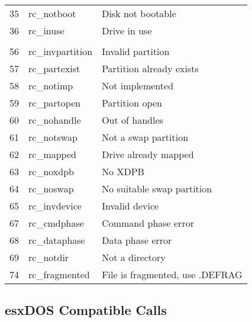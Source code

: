 \begin{longtable}[ht]{ l l l }
  35 & rc\_notboot & Disk not bootable\\
  36 & rc\_inuse & Drive in use\\
  \\
  56 & rc\_invpartition & Invalid partition\\
  57 & rc\_partexist & Partition already exists\\
  58 & rc\_notimp & Not implemented\\
  59 & rc\_partopen & Partition open\\
  60 & rc\_nohandle & Out of handles\\
  61 & rc\_notswap & Not a swap partition\\
  62 & rc\_mapped & Drive already mapped\\
  63 & rc\_noxdpb & No XDPB\\
  64 & rc\_noswap & No suitable swap partition\\
  65 & rc\_invdevice & Invalid device\\
  67 & rc\_cmdphase & Command phase error\\
  68 & rc\_dataphase & Data phase error\\
  69 & rc\_notdir & Not a directory\\
  74 & rc\_fragmented & File is fragmented, use .DEFRAG\\
\end{longtable}
\endgroup

\subsection{esxDOS Compatible Calls}


